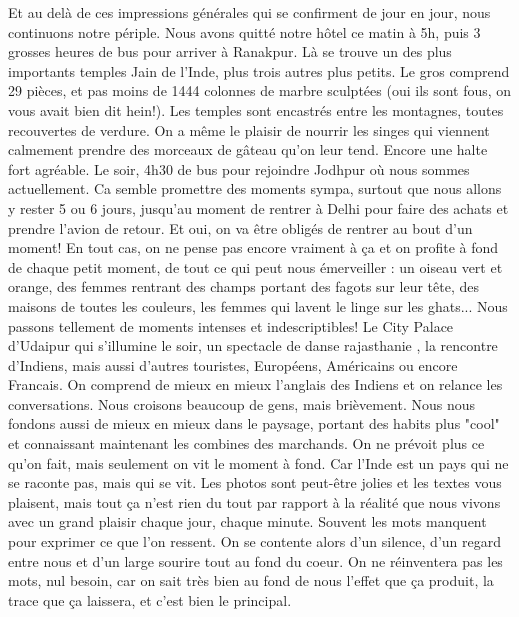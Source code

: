 \begin{multicols}{2}
Et au delà de ces impressions générales qui se confirment de jour en jour, nous continuons notre périple. Nous avons quitté notre hôtel ce matin à 5h, puis 3 grosses heures de bus pour arriver à Ranakpur. Là se trouve un des plus importants temples Jain de l'Inde, plus trois autres plus petits. Le gros comprend 29 pièces, et pas moins de 1444 colonnes de marbre sculptées (oui ils sont fous, on vous avait bien dit hein!). Les temples sont encastrés entre les montagnes, toutes recouvertes de verdure. On a même le plaisir de nourrir les singes qui viennent calmement prendre des morceaux de gâteau qu'on leur tend. Encore une halte fort agréable. Le soir, 4h30 de bus pour rejoindre Jodhpur où nous sommes actuellement. Ca semble promettre des moments sympa, surtout que nous allons y rester 5 ou 6 jours, jusqu'au moment de rentrer à Delhi pour faire des achats et prendre l'avion de retour. Et oui, on va être obligés de rentrer au bout d'un moment! En tout cas, on ne pense pas encore vraiment à ça et on profite à fond de chaque petit moment, de tout ce qui peut nous émerveiller : un oiseau vert et orange, des femmes rentrant des champs portant des fagots sur leur tête, des maisons de toutes les couleurs, les femmes qui lavent le linge sur les ghats... Nous passons tellement de moments intenses et indescriptibles! Le City Palace d'Udaipur qui s'illumine le soir, un spectacle de danse rajasthanie , la rencontre d'Indiens, mais aussi d'autres touristes, Européens, Américains ou encore Francais. On comprend de mieux en mieux l'anglais des Indiens et on relance les conversations. Nous croisons beaucoup de gens, mais brièvement. Nous nous fondons aussi de mieux en mieux dans le paysage, portant des habits plus "cool" et connaissant maintenant les combines des marchands. On ne prévoit plus ce qu'on fait, mais seulement on vit le moment à fond. Car l'Inde est un pays qui ne se raconte pas, mais qui se vit. Les photos sont peut-être jolies et les textes vous plaisent, mais tout ça n'est rien du tout par rapport à la réalité que nous vivons avec un grand plaisir chaque jour, chaque minute. Souvent les mots manquent pour exprimer ce que l'on ressent. On se contente alors d'un silence, d'un regard entre nous et d'un large sourire tout au fond du coeur. On ne réinventera pas les mots, nul besoin, car on sait très bien au fond de nous l'effet que ça produit, la trace que ça laissera, et c'est bien le principal.



\end{multicols}

